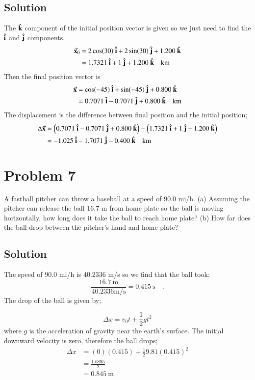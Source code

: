 \documentclass{article}
\begin{document}
\subsection*{Solution}
The $\vu k$ component of the initial position vector is given so we just need to find the $\vu i$ and $\vu j$ components.
\begin{align*}
	\va x_0 &= 2\cos(30)\ \vu i + 2\sin(30)\ \vu j + 1.200\ \vu k \\
		&= 1.7321\ \vu i + 1\ \vu j + 1.200\ \vu k \quad \text{km}
\end{align*}
Then the final position vector is
\begin{align*}
	\va x &= \cos(-45)\ \vu i + \sin(-45)\ \vu j + 0.800\ \vu k \\
	      &= 0.7071\ \vu i -0.7071\ \vu j + 0.800\ \vu k \quad \text{km}
\end{align*}
The displacement is the difference between final position and the initial position;
\begin{align*}
	\Delta \va x &= \left(0.7071\ \vu i -0.7071\ \vu j + 0.800\ \vu k \right) - \left( 1.7321\ \vu i + 1\ \vu j + 1.200\ \vu k \right) \\
		     &= -1.025\ \vu  i - 1.7071\ \vu j -0.400\ \vu k \quad \text{km}
\end{align*}

\section*{Problem 7}
A fastball pitcher can throw a baseball at a speed of 90.0 mi/h.
(a) Assuming the pitcher can release the ball 16.7 m from home plate so the ball is moving horizontally, how long does it take
the ball to reach home plate?
(b) How far does the ball drop between the pitcher’s hand and home plate?

\subsection*{Solution}
The speed of 90.0 mi/h is 40.2336 m/s so we find that the ball took;
\[
	\frac{16.7\ \text{m}}{40.2336 \text{m/s}} = 0.415\ \text{s} \quad .
\]
The drop of the ball is given by;

\begin{equation}
	\Delta x =  v_0 t + \frac{1}{2}gt^2
\end{equation}
where $g$ is the acceleration of gravity near the earth's surface. The initial downward velocity is zero, therefore the ball drops;
\begin{align*}
	\Delta x &= (0)(0.415) + \frac{1}{2}9.81(0.415)^2 \\
		 &= \frac{1.6895}{2} \\
		 &= 0.845\ \text{m}
\end{align*}
\end{document}
